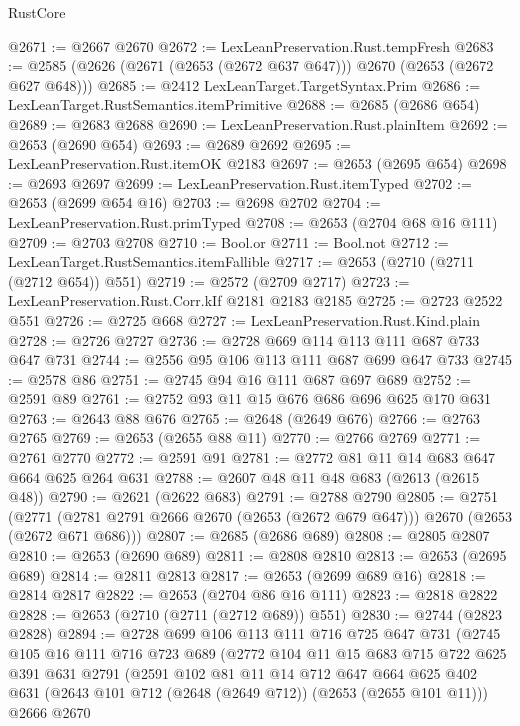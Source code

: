 \begin{lexlean}{RustCore}
\begin{coremodule}
@2671 := @2667 @2670
@2672 := LexLeanPreservation.Rust.tempFresh
@2683 := @2585 (@2626 (@2671 (@2653 (@2672 @637 @647))) @2670 (@2653 (@2672 @627 @648)))
@2685 := @2412 LexLeanTarget.TargetSyntax.Prim
@2686 := LexLeanTarget.RustSemantics.itemPrimitive
@2688 := @2685 (@2686 @654)
@2689 := @2683 @2688
@2690 := LexLeanPreservation.Rust.plainItem
@2692 := @2653 (@2690 @654)
@2693 := @2689 @2692
@2695 := LexLeanPreservation.Rust.itemOK @2183
@2697 := @2653 (@2695 @654)
@2698 := @2693 @2697
@2699 := LexLeanPreservation.Rust.itemTyped
@2702 := @2653 (@2699 @654 @16)
@2703 := @2698 @2702
@2704 := LexLeanPreservation.Rust.primTyped
@2708 := @2653 (@2704 @68 @16 @111)
@2709 := @2703 @2708
@2710 := Bool.or
@2711 := Bool.not
@2712 := LexLeanTarget.RustSemantics.itemFallible
@2717 := @2653 (@2710 (@2711 (@2712 @654)) @551)
@2719 := @2572 (@2709 @2717)
@2723 := LexLeanPreservation.Rust.Corr.kIf @2181 @2183 @2185
@2725 := @2723 @2522 @551
@2726 := @2725 @668
@2727 := LexLeanPreservation.Rust.Kind.plain
@2728 := @2726 @2727
@2736 := @2728 @669 @114 @113 @111 @687 @733 @647 @731
@2744 := @2556 @95 @106 @113 @111 @687 @699 @647 @733
@2745 := @2578 @86
@2751 := @2745 @94 @16 @111 @687 @697 @689
@2752 := @2591 @89
@2761 := @2752 @93 @11 @15 @676 @686 @696 @625 @170 @631
@2763 := @2643 @88 @676
@2765 := @2648 (@2649 @676)
@2766 := @2763 @2765
@2769 := @2653 (@2655 @88 @11)
@2770 := @2766 @2769
@2771 := @2761 @2770
@2772 := @2591 @91
@2781 := @2772 @81 @11 @14 @683 @647 @664 @625 @264 @631
@2788 := @2607 @48 @11 @48 @683 (@2613 (@2615 @48))
@2790 := @2621 (@2622 @683)
@2791 := @2788 @2790
@2805 := @2751
    (@2771 (@2781 @2791 @2666 @2670 (@2653 (@2672 @679 @647))) @2670 (@2653 (@2672 @671 @686)))
@2807 := @2685 (@2686 @689)
@2808 := @2805 @2807
@2810 := @2653 (@2690 @689)
@2811 := @2808 @2810
@2813 := @2653 (@2695 @689)
@2814 := @2811 @2813
@2817 := @2653 (@2699 @689 @16)
@2818 := @2814 @2817
@2822 := @2653 (@2704 @86 @16 @111)
@2823 := @2818 @2822
@2828 := @2653 (@2710 (@2711 (@2712 @689)) @551)
@2830 := @2744 (@2823 @2828)
@2894 := @2728
    @699
    @106
    @113
    @111
    @716
    @725
    @647
    @731
    (@2745
      @105
      @16
      @111
      @716
      @723
      @689
      (@2772
        @104
        @11
        @15
        @683
        @715
        @722
        @625
        @391
        @631
        @2791
        (@2591
          @102
          @81
          @11
          @14
          @712
          @647
          @664
          @625
          @402
          @631
          (@2643 @101 @712 (@2648 (@2649 @712)) (@2653 (@2655 @101 @11)))
          @2666
          @2670

\end{coremodule}
\end{lexlean}
